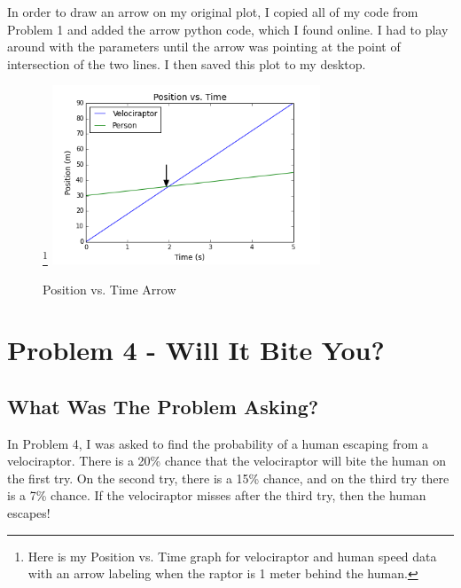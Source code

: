 \documentclass[twocolumn]{revtex4}
\begin{document}
In order to draw an arrow on my original plot, I copied all of my code from Problem 1 and added the arrow python code, which I found online. I had to play around with the parameters until the arrow was pointing at the point of intersection of the two lines. I then saved this plot to my desktop.

\graphicspath{ {Desktop/CSIS_200_F15/} }
\begin{figure}[h]
\caption{Position vs. Time Arrow}
\footnote{Here is my Position vs. Time graph for velociraptor and human speed data with an arrow labeling when the raptor is 1 meter behind the human.\label{fig:posvs.time-arrow}}
\includegraphics[width=8cm]{Position_vs_Time_Arrow}
\end{figure}



\section{Problem 4 - Will It Bite You?}
\subsection{What Was The Problem Asking?}
In Problem 4, I was asked to find the probability of a human escaping from a velociraptor. There is a 20\% chance that the velociraptor will bite the human on the first try. On the second try, there is a 15\% chance, and on the third try there is a 7\% chance. If the velociraptor misses after the third try, then the human escapes!
\end{document}
